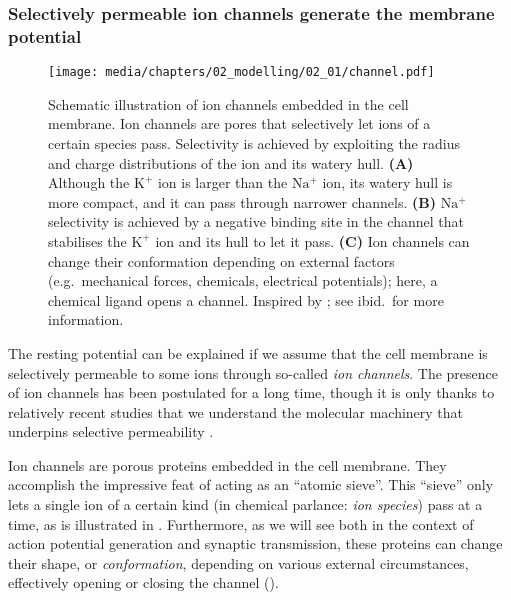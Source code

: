 \subsubsection{Selectively permeable ion channels generate the membrane potential}
\begin{figure}
	\centering
	\texttt{[image: media/chapters/02\_modelling/02\_01/channel.pdf]}%
	{\label{fig:ion_channels_k}}%
	{\label{fig:ion_channels_na}}%
	{\label{fig:ion_channels_gate}}%
	\caption[Schematic illustration of ion channels  embedded into the cell membrane]{Schematic illustration of ion channels embedded in the cell membrane. Ion channels are pores that selectively let ions of a certain species pass. Selectivity is achieved by exploiting the radius and charge distributions of the ion and its watery hull. \textbf{(A)} Although the $\mathrm{K^+}$ ion is larger than the $\mathrm{Na^+}$ ion, its watery hull is more compact, and it can pass through narrower channels. \textbf{(B)}  $\mathrm{Na^+}$ selectivity is achieved by a negative binding site in the channel that stabilises the $\mathrm{K^+}$ ion and its hull to let it pass.  \textbf{(C)} Ion channels can change their conformation depending on external factors (e.g.~mechanical forces, chemicals, electrical potentials); here, a chemical ligand opens a channel. Inspired by \citet[Figure~5-1, p.~102 and Figure~5-6, p.~109]{kandel2012principles}; see ibid.~for more information.}
\end{figure}
The resting potential can be explained if we assume that the cell membrane is selectively permeable to some ions through so-called \emph{ion channels}.
The presence of ion channels has been postulated for a long time, though it is only thanks to relatively recent studies that we understand the molecular machinery that underpins selective permeability \citep[Chapter~5]{kandel2012principles}.

Ion channels are porous proteins embedded in the cell membrane.
They accomplish the impressive feat of acting as an \enquote{atomic sieve}.
This \enquote{sieve} only lets a single ion of a certain kind (in chemical parlance: \emph{ion species}) pass at a time, as is illustrated in .
Furthermore, as we will see both in the context of action potential generation and synaptic transmission, these proteins can change their shape, or \emph{conformation}, depending on various external circumstances, effectively opening or closing the channel ().

